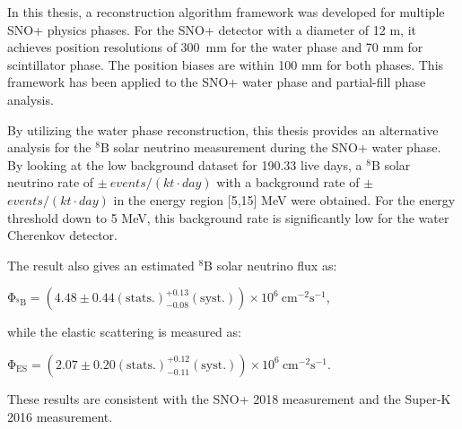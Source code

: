 In this thesis, a reconstruction algorithm framework was developed for multiple SNO+ physics phases. For the SNO+ detector with a diameter of 12 m, it achieves position resolutions of 300~mm for the water phase and 70 mm for scintillator phase. The position biases are within 100 mm for both phases. This framework has been applied to the SNO+ water phase and partial-fill phase analysis. 

By utilizing the water phase reconstruction, this thesis provides an alternative analysis for the $^8$B solar neutrino measurement during the SNO+ water phase. By looking at the low background dataset for 190.33 live days, a $^8$B solar neutrino rate of $ \pm~events/(kt\cdot day)$ with a background rate of $ \pm $ $events/(kt\cdot day)$ in the energy region [5,15] MeV were obtained. For the energy threshold down to 5 MeV, this background rate is significantly low for the water Cherenkov detector.

The result also gives an estimated $^8$B solar neutrino flux as:

$\mathrm{\Phi_{^8B}=(4.48 \pm 0.44(stats.)^{+0.13}_{-0.08}(syst.))\times10^6~cm^{-2}s^{-1}}$, 

while the elastic scattering is measured as:

 $\mathrm{\Phi_{ES}=(2.07 \pm 0.20(stats.)^{+0.12}_{-0.11}(syst.))\times10^6~cm^{-2}s^{-1}}$.
 
 These results are consistent with the SNO+ 2018 measurement\cite{anderson2019measurement} and the Super-K 2016 measurement\cite{abe2016solar}.